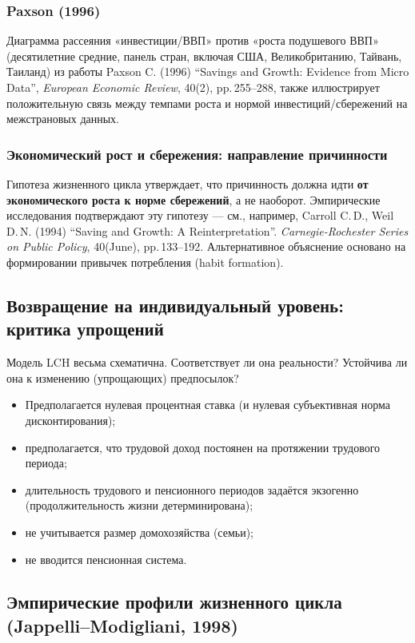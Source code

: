 \documentclass[10pt,a4paper]{article}
\begin{document}
\subsubsection{Paxson (1996)}

Диаграмма рассеяния «инвестиции/ВВП» против «роста подушевого ВВП» (десятилетние средние, панель стран, включая США, Великобританию, Тайвань, Таиланд) из работы Paxson C. (1996) ``Savings and Growth: Evidence from Micro Data'', \textit{European Economic Review}, 40(2), pp.\,255--288, также иллюстрирует положительную связь между темпами роста и нормой инвестиций/сбережений на межстрановых данных.

\subsubsection{Экономический рост и сбережения: направление причинности}

Гипотеза жизненного цикла утверждает, что причинность должна идти \textbf{от экономического роста к норме сбережений}, а не наоборот. Эмпирические исследования подтверждают эту гипотезу — см., например, Carroll C.\,D., Weil D.\,N. (1994) ``Saving and Growth: A Reinterpretation''. \textit{Carnegie-Rochester Series on Public Policy}, 40(June), pp.\,133--192. Альтернативное объяснение основано на формировании привычек потребления (habit formation).

\subsection{Возвращение на индивидуальный уровень: критика упрощений}

Модель LCH весьма схематична. Соответствует ли она реальности? Устойчива ли она к изменению (упрощающих) предпосылок?
\begin{itemize}[leftmargin=1.3em]
\item Предполагается нулевая процентная ставка (и нулевая субъективная норма дисконтирования);
\item предполагается, что трудовой доход постоянен на протяжении трудового периода;
\item длительность трудового и пенсионного периодов задаётся экзогенно (продолжительность жизни детерминирована);
\item не учитывается размер домохозяйства (семьи);
\item не вводится пенсионная система.
\end{itemize}

\subsection{Эмпирические профили жизненного цикла (Jappelli--Modigliani, 1998)}
\end{document}
